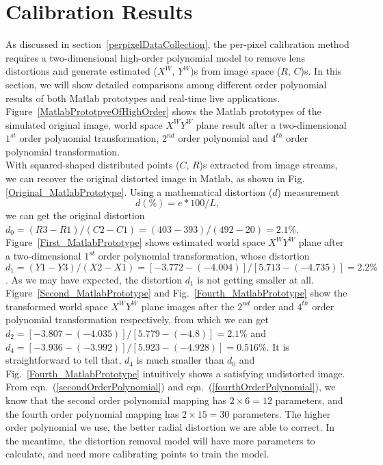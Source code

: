 \section{Calibration Results}
\label{sectionPrototypeTwoDtransformation} 
As discussed in section~\ref{perpixelDataCollection}, the per-pixel calibration method requires a two-dimensional high-order polynomial model to remove lens distortions and generate estimated (\(X^W,\, Y^W\))s from image space (\(R, \, C\))s. In this section, we will show detailed comparisons among different order polynomial results of both Matlab prototypes and real-time live applications. Figure~\ref{MatlabPrototpyeOfHighOrder} shows the Matlab prototypes of the simulated original image, world space \(X^WY^W\) plane result after a two-dimensional \(1^{st}\) order polynomial transformation, \(2^{nd}\) order polynomial and \(4^{th}\) order polynomial transformation. %
%
\\\indent
With squared-shaped distributed points (\(C,\, R\))s extracted from image streams, we can recover the original distorted image in Matlab, as shown in Fig.\ref{Original_MatlabPrototype}. Using a mathematical distortion (\(d\)) measurement \cite{distortionMeasurement_2012}
%
\begin{equation}
d (\%)=  e*100/L ,
\label{mathematicalDistortion}
\end{equation}%
%
\noindent
we can get the original distortion \(d_0 = (R3 - R1) / (C2 -C1) = (403 - 393) / (492 - 20) = 2.1\%\). Figure~\ref{First_MatlabPrototype} shows estimated world space \(X^WY^W\) plane after a two-dimensional \(1^{st}\) order polynomial transformation, whose distortion \(d_1 = (Y1 - Y3) / (X2 -X1) = [-3.772 - (-4.004)] / [5.713 - (-4.735)] = 2.2\%\). As we may have expected, the distortion \(d_1\) is not getting smaller at all. Figure~\ref{Second_MatlabPrototype} and Fig.~\ref{Fourth_MatlabPrototype} show the transformed world space \(X^WY^W\) plane images after the \(2^{nd}\) order and \(4^{th}\) order polynomial transformation respectively, from which we can get \(d_2 = [-3.807 - (-4.035)] / [5.779 - (-4.8)] = 2.1\%\) and \(d_4 = [-3.936 - (-3.992)] / [5.923 - (-4.928)] = 0.516\%\). It is straightforward to tell that, \(d_4\) is much smaller than \(d_0\) and Fig.~\ref{Fourth_MatlabPrototype} intuitively shows a satisfying undistorted image. From eqn.~(\ref{secondOrderPolynomial}) and eqn.~(\ref{fourthOrderPolynomial}), we know that the second order polynomial mapping has $2\times6=12$ parameters, and the fourth order polynomial mapping has $2\times15=30$ parameters. The higher order polynomial we use, the better radial distortion we are able to correct. In the meantime, the distortion removal model will have more parameters to calculate, and need more calibrating points to train the model.%
